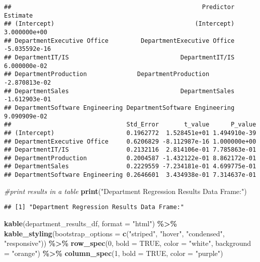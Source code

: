 \documentclass[
]{article}
\newenvironment{Shaded}{\begin{snugshade}}{\end{snugshade}}
\newcommand{\AttributeTok}[1]{\textcolor[rgb]{0.13,0.29,0.53}{#1}}
\newcommand{\CommentTok}[1]{\textcolor[rgb]{0.56,0.35,0.01}{\textit{#1}}}
\newcommand{\ConstantTok}[1]{\textcolor[rgb]{0.56,0.35,0.01}{#1}}
\newcommand{\DecValTok}[1]{\textcolor[rgb]{0.00,0.00,0.81}{#1}}
\newcommand{\FunctionTok}[1]{\textcolor[rgb]{0.13,0.29,0.53}{\textbf{#1}}}
\newcommand{\NormalTok}[1]{#1}
\newcommand{\SpecialCharTok}[1]{\textcolor[rgb]{0.81,0.36,0.00}{\textbf{#1}}}
\newcommand{\StringTok}[1]{\textcolor[rgb]{0.31,0.60,0.02}{#1}}
\begin{document}
\begin{verbatim}
##                                                     Predictor      Estimate
## (Intercept)                                       (Intercept)  3.000000e+00
## DepartmentExecutive Office         DepartmentExecutive Office -5.035592e-16
## DepartmentIT/IS                               DepartmentIT/IS  6.000000e-02
## DepartmentProduction              DepartmentProduction        -2.870813e-02
## DepartmentSales                               DepartmentSales -1.612903e-01
## DepartmentSoftware Engineering DepartmentSoftware Engineering  9.090909e-02
##                                Std_Error       t_value      P_value
## (Intercept)                    0.1962772  1.528451e+01 1.494910e-39
## DepartmentExecutive Office     0.6206829 -8.112987e-16 1.000000e+00
## DepartmentIT/IS                0.2132116  2.814106e-01 7.785863e-01
## DepartmentProduction           0.2004587 -1.432122e-01 8.862172e-01
## DepartmentSales                0.2229559 -7.234181e-01 4.699775e-01
## DepartmentSoftware Engineering 0.2646601  3.434938e-01 7.314637e-01
\end{verbatim}

\begin{Shaded}
\begin{Highlighting}[]
\CommentTok{\#print results in a table}
\FunctionTok{print}\NormalTok{(}\StringTok{"Department Regression Results Data Frame:"}\NormalTok{)}
\end{Highlighting}
\end{Shaded}

\begin{verbatim}
## [1] "Department Regression Results Data Frame:"
\end{verbatim}

\begin{Shaded}
\begin{Highlighting}[]
\FunctionTok{kable}\NormalTok{(department\_results\_df, }\AttributeTok{format =} \StringTok{"html"}\NormalTok{) }\SpecialCharTok{\%\textgreater{}\%}
  \FunctionTok{kable\_styling}\NormalTok{(}\AttributeTok{bootstrap\_options =} \FunctionTok{c}\NormalTok{(}\StringTok{"striped"}\NormalTok{, }\StringTok{"hover"}\NormalTok{, }\StringTok{"condensed"}\NormalTok{, }\StringTok{"responsive"}\NormalTok{)) }\SpecialCharTok{\%\textgreater{}\%}
  \FunctionTok{row\_spec}\NormalTok{(}\DecValTok{0}\NormalTok{, }\AttributeTok{bold =} \ConstantTok{TRUE}\NormalTok{, }\AttributeTok{color =} \StringTok{"white"}\NormalTok{, }\AttributeTok{background =} \StringTok{"orange"}\NormalTok{) }\SpecialCharTok{\%\textgreater{}\%}
  \FunctionTok{column\_spec}\NormalTok{(}\DecValTok{1}\NormalTok{, }\AttributeTok{bold =} \ConstantTok{TRUE}\NormalTok{, }\AttributeTok{color =} \StringTok{"purple"}\NormalTok{)}
\end{Highlighting}
\end{Shaded}
\end{document}
